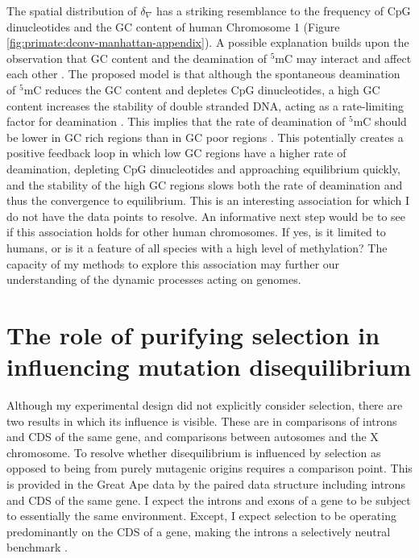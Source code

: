 The spatial distribution of $\delta_\nabla$ has a striking resemblance to the frequency of CpG dinucleotides and the GC content of human Chromosome 1 (Figure \ref{fig:primate:dconv-manhattan-appendix}). A possible explanation builds upon the observation that GC content and the deamination of $^5$mC may interact and affect each other \citep{Fryxell2000CytosineIsochores, Mugal2015EvolutionaryGenomes}. The proposed model is that although the spontaneous deamination of $^5$mC reduces the GC content and depletes CpG dinucleotides,  a high GC content increases the stability of double stranded DNA, acting as a rate-limiting factor for deamination \citep{Mugal2015EvolutionaryGenomes}. This implies that the rate of deamination of $^5$mC should be lower in GC rich regions than in GC poor regions \citep{Mugal2015EvolutionaryGenomes}. This potentially creates a positive feedback loop in which low GC regions have a higher rate of deamination, depleting CpG dinucleotides and approaching equilibrium quickly, and the stability of the high GC regions slows both the rate of deamination and thus the convergence to equilibrium. This is an interesting association for which I do not have the data points to resolve. An informative next step would be to see if this association holds for other human chromosomes. If yes, is it limited to humans, or is it a feature of all species with a high level of methylation? The capacity of my methods to explore this association may further our understanding of the dynamic processes acting on genomes. 

\section{The role of purifying selection in influencing mutation disequilibrium}

Although my experimental design did not explicitly consider selection, there are two results in which its influence is visible. These are in comparisons of introns and CDS of the same gene, and comparisons between autosomes and the X chromosome. To resolve whether disequilibrium is influenced by selection as opposed to being from purely mutagenic origins requires a comparison point. This is provided in the Great Ape data by the paired data structure including introns and CDS of the same gene. I expect the introns and exons of a gene to be subject to essentially the same environment. Except, I expect selection to be operating predominantly on the CDS of a gene, making the introns a selectively neutral benchmark \citep{Graur2013OnENCODE}. 


